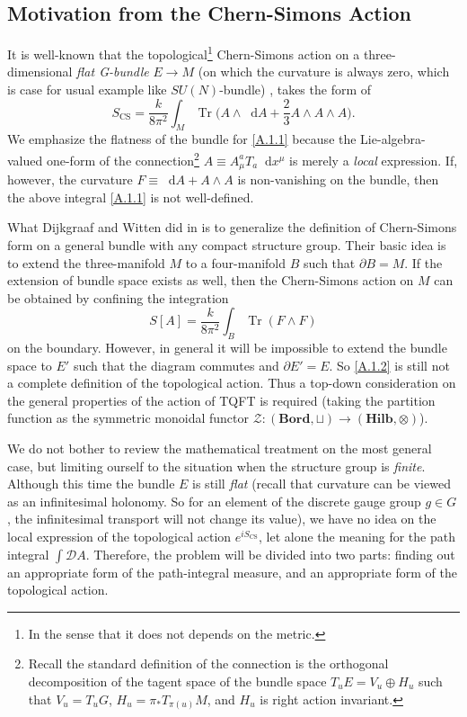 \documentclass[10pt,nofootinbib,letterpaper]{revtex4}
\newcommand*\dd{\mathop{}\!\mathrm{d}}
\def\Z{\mathcal{Z}}
\def\D{\mathcal{D}}
\begin{document}
	\subsection{Motivation from the Chern-Simons Action}
		It is well-known that the topological\footnote{In the sense that it does not depends on the metric.} Chern-Simons action on a three-dimensional \emph{flat G-bundle} $E\rightarrow M$ (on which the curvature is always zero, which is case for usual example like $SU(N)$-bundle) , takes the form of
		\begin{equation}\label{A.1.1}
			S_{\text{CS}}=\dfrac{k}{8\pi^2}\int_M\mathop{\mathrm{Tr}}\bigg(A\wedge\dd A+\dfrac{2}{3}A\wedge A\wedge A\bigg).
		\end{equation}
		We emphasize the flatness of the bundle for \eqref{A.1.1} because the Lie-algebra-valued one-form of the connection\footnote{Recall the standard definition of the connection is the orthogonal decomposition of the tagent space of the bundle space $T_uE=V_u\oplus H_u$ such that $V_u=T_uG$, $H_u=\pi_* T_{\pi(u)}M$, and $H_u$ is right action invariant.} $A\equiv A^a_\mu T_a\dd x^\mu$ is merely a \emph{local} expression. If, however, the curvature $F\equiv\dd A+A\wedge A$ is non-vanishing on the bundle, then the above integral \eqref{A.1.1} is not well-defined.
		\par What Dijkgraaf and Witten did in \cite{dijkgraaf1990topological} is to generalize the definition of Chern-Simons form on a general bundle with any compact structure group. Their basic idea is to extend the three-manifold $M$ to a four-manifold $B$ such that $\partial B=M$. If the extension of bundle space exists as well, then the Chern-Simons action on $M$ can be obtained by confining the integration
		\begin{equation}\label{A.1.2}
			S[A]=\dfrac{k}{8\pi^2}\int_B\mathop{\mathrm{Tr}}(F\wedge F)
		\end{equation}
		on the boundary. However, {\color{red}in general it will be impossible to extend the bundle space to $E'$ such that the diagram commutes and $\partial E'=E$. So \eqref{A.1.2} is still not a complete definition of the topological action}. Thus a top-down consideration on the general properties of the action of TQFT is required (taking the partition function as the symmetric monoidal functor $\Z:(\mathbf{Bord},\sqcup)\to(\mathbf{Hilb},\otimes)$).\par
		
		We do not bother to review the mathematical treatment on the most general case, but limiting ourself to the situation {\color{blue}when the structure group is \emph{finite}}. Although this time the bundle $E$ is still \emph{flat} (recall that curvature can be viewed as an infinitesimal holonomy. So for an element of the discrete gauge group $g\in G$, the infinitesimal transport will not change its value), we have no idea on the local expression of the topological action $e^{iS_{\text{CS}}}$, let alone the meaning for the path integral $\int\D A$. Therefore, the problem will be divided into two parts: finding out an appropriate form of the path-integral measure, and an appropriate form of the topological action.
\end{document}

